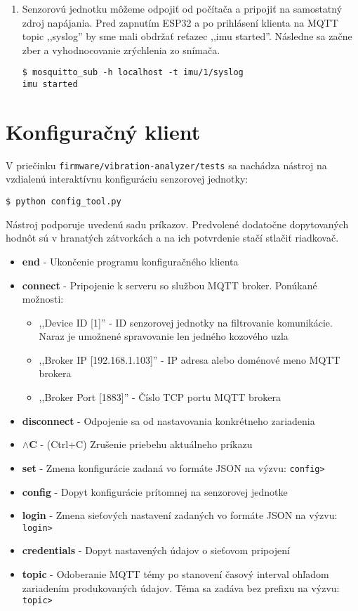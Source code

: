 \begin{enumerate}
\item Senzorovú jednotku môžeme odpojiť od počítača a pripojiť na samostatný zdroj napájania.
Pred zapnutím ESP32 a po prihlásení klienta na MQTT topic ,,syslog'' by sme mali obdržať reťazec ,,imu started''.
Následne sa začne zber a vyhodnocovanie zrýchlenia zo snímača.
\begin{lstlisting}[style=messages]
$ mosquitto_sub -h localhost -t imu/1/syslog
imu started
\end{lstlisting}
\end{enumerate}

\section{Konfiguračný klient}
V priečinku \verb|firmware/vibration-analyzer/tests| sa nachádza nástroj
na vzdialenú interaktívnu konfiguráciu senzorovej jednotky:
\begin{lstlisting}[style=messages]
$ python config_tool.py
\end{lstlisting}

Nástroj podporuje uvedenú sadu príkazov. Predvolené dodatočne dopytovaných 
hodnôt sú v hranatých zátvorkách a na ich potvrdenie stačí stlačiť riadkovač.

\begin{itemize}[noitemsep, topsep=0pt]
	\item \textbf{end} - Ukončenie programu konfiguračného klienta
	\item \textbf{connect} - Pripojenie k serveru so službou MQTT broker. Ponúkané možnosti:
		\begin{itemize}
			\item ,,Device ID [1]'' - ID senzorovej jednotky na filtrovanie komunikácie. Naraz je umožnené spravovanie len 
			jedného kozového uzla
      		\item ,,Broker IP [192.168.1.103]'' - IP adresa alebo doménové meno MQTT brokera
        	\item ,,Broker Port [1883]'' - Číslo TCP portu MQTT brokera
		\end{itemize}
	\item \textbf{disconnect} - Odpojenie sa od nastavovania konkrétneho zariadenia
	\item \textbf{$\wedge$C} - (Ctrl+C) Zrušenie priebehu aktuálneho príkazu
	\item \textbf{set} - Zmena konfigurácie zadaná vo formáte JSON na výzvu: \verb|config>|
	\item \textbf{config} - Dopyt konfigurácie prítomnej na senzorovej jednotke
	\item \textbf{login} - Zmena sieťových nastavení zadaných vo formáte JSON na výzvu: \verb|login>|
	\item \textbf{credentials} - Dopyt nastavených údajov o sieťovom pripojení
	\item \textbf{topic} - Odoberanie MQTT témy po stanovení časový interval ohľadom zariadením produkovaných údajov. 
	Téma sa zadáva bez prefixu na výzvu: \verb|topic>| 
\end{itemize}

